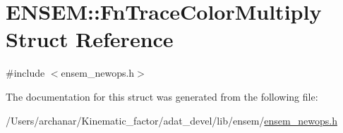 \hypertarget{structENSEM_1_1FnTraceColorMultiply}{}\section{E\+N\+S\+EM\+:\+:Fn\+Trace\+Color\+Multiply Struct Reference}
\label{structENSEM_1_1FnTraceColorMultiply}


{\ttfamily \#include $<$ensem\+\_\+newops.\+h$>$}



The documentation for this struct was generated from the following file\+:\begin{DoxyCompactItemize}
\item 
/\+Users/archanar/\+Kinematic\+\_\+factor/adat\+\_\+devel/lib/ensem/\mbox{\hyperlink{lib_2ensem_2ensem__newops_8h}{ensem\+\_\+newops.\+h}}\end{DoxyCompactItemize}
